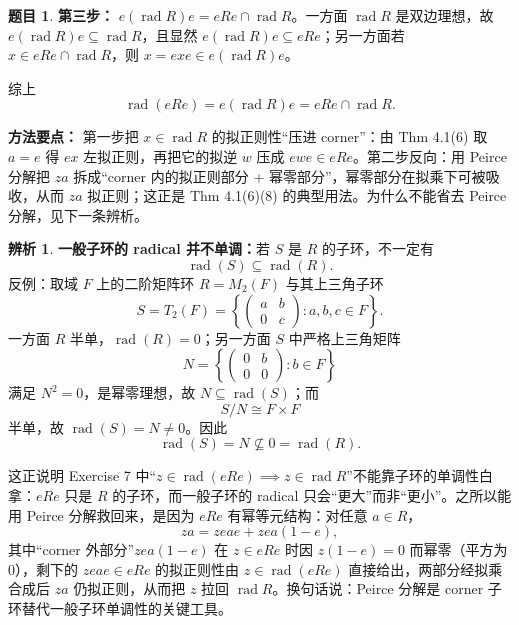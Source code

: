 \documentclass[a4paper]{ctexart}
\theoremstyle{definition}
\newtheorem{example}{题目}[section]
\theoremstyle{analysis}
\newtheorem{remark}{辨析}[section]
\theoremstyle{plain}
\begin{document}
\begin{example}
\medskip

\textbf{第三步：} \(e(\operatorname{rad}R)e=eRe\cap\operatorname{rad}R\)。一方面 \(\operatorname{rad}R\) 是双边理想，故 \(e(\operatorname{rad}R)e\subseteq\operatorname{rad}R\)，且显然 \(e(\operatorname{rad}R)e\subseteq eRe\)；另一方面若 \(x\in eRe\cap\operatorname{rad}R\)，则 \(x=exe\in e(\operatorname{rad}R)e\)。

综上
\[
  \operatorname{rad}(eRe)=e(\operatorname{rad}R)e=eRe\cap\operatorname{rad}R.
\]

\textbf{方法要点：}
第一步把 \(x\in\operatorname{rad}R\) 的拟正则性“压进 corner”：由 Thm 4.1(6) 取 \(a=e\) 得 \(ex\) 左拟正则，再把它的拟逆 \(w\) 压成 \(ewe\in eRe\)。第二步反向：用 Peirce 分解把 \(za\) 拆成“corner 内的拟正则部分 + 幂零部分”，幂零部分在拟乘下可被吸收，从而 \(za\) 拟正则；这正是 Thm 4.1(6)(8) 的典型用法。为什么不能省去 Peirce 分解，见下一条辨析。
\end{example}

\begin{remark}
\textbf{一般子环的 radical 并不单调：}若 \(S\) 是 \(R\) 的子环，不一定有
\[
  \operatorname{rad}(S)\subseteq\operatorname{rad}(R).
\]
反例：取域 \(F\) 上的二阶矩阵环 \(R=M_2(F)\) 与其上三角子环
\[
  S=T_2(F)=\left\{\begin{pmatrix}a&b\\0&c\end{pmatrix}:a,b,c\in F\right\}.
\]
一方面 \(R\) 半单，\(\operatorname{rad}(R)=0\)；另一方面 \(S\) 中严格上三角矩阵
\[
  N=\left\{\begin{pmatrix}0&b\\0&0\end{pmatrix}:b\in F\right\}
\]
满足 \(N^2=0\)，是幂零理想，故 \(N\subseteq\operatorname{rad}(S)\)；而
\[
  S/N\cong F\times F
\]
半单，故 \(\operatorname{rad}(S)=N\neq 0\)。因此
\[
  \operatorname{rad}(S)=N\not\subseteq 0=\operatorname{rad}(R).
\]

这正说明 Exercise 7 中“\(z\in\operatorname{rad}(eRe)\implies z\in\operatorname{rad}R\)”不能靠子环的单调性白拿：\(eRe\) 只是 \(R\) 的子环，而一般子环的 radical 只会“更大”而非“更小”。之所以能用 Peirce 分解救回来，是因为 \(eRe\) 有幂等元结构：对任意 \(a\in R\)，
\[
  za=zeae+zea(1-e),
\]
其中“corner 外部分”\(zea(1-e)\) 在 \(z\in eRe\) 时因 \(z(1-e)=0\) 而幂零（平方为 \(0\)），剩下的 \(zeae\in eRe\) 的拟正则性由 \(z\in\operatorname{rad}(eRe)\) 直接给出，两部分经拟乘合成后 \(za\) 仍拟正则，从而把 \(z\) 拉回 \(\operatorname{rad}R\)。换句话说：Peirce 分解是 corner 子环替代一般子环单调性的关键工具。
\end{remark}
\end{document}
